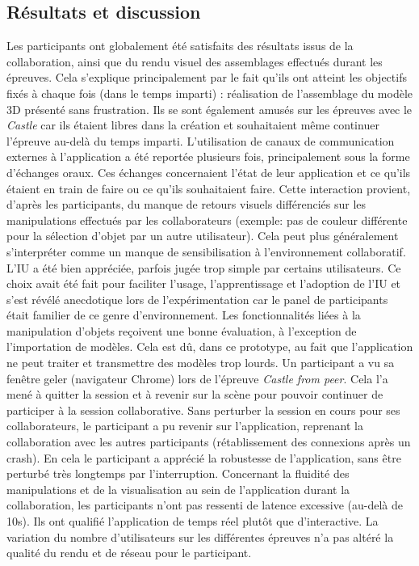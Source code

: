 \subsection{Résultats et discussion}
Les participants ont globalement été satisfaits des résultats issus de la 
collaboration, ainsi que du rendu visuel des assemblages effectués durant les 
épreuves. Cela s'explique principalement par le fait qu'ils ont atteint les 
objectifs fixés à chaque fois (dans le temps imparti) : réalisation de l'assemblage du modèle \gls{3D} 
présenté sans frustration. Ils se sont également \og amusés\fg{} sur les épreuves
avec le \textit{Castle} car ils étaient libres dans la création et souhaitaient même continuer l'épreuve au-delà du temps imparti. L'utilisation de canaux de communication 
externes à l'application a été reportée plusieurs fois, principalement sous la forme 
d'échanges oraux. Ces échanges concernaient l'état de leur application et ce qu'ils 
étaient en train de faire ou ce qu'ils souhaitaient faire. Cette interaction provient, 
d'après les participants, du manque de retours visuels différenciés sur les 
manipulations effectués par les collaborateurs (exemple: pas de couleur différente 
pour la sélection d'objet par un autre utilisateur). Cela peut plus généralement 
s'interpréter comme un manque de sensibilisation à l'environnement collaboratif. 
L'\gls{IU} a été bien appréciée, parfois jugée \og trop simple\fg{} par certains 
utilisateurs. Ce choix avait été fait pour faciliter l'usage, l'apprentissage et 
l'adoption de l'\gls{IU} et s'est révélé anecdotique lors de l'expérimentation car le 
panel de participants était familier de ce genre 
d'environnement.
Les fonctionnalités liées à la manipulation d'objets reçoivent une bonne évaluation, 
à l'exception de l'importation de modèles. Cela est dû, dans ce prototype, au 
fait que l'application ne peut traiter et transmettre des modèles trop lourds. Un 
participant a vu sa fenêtre \og geler\fg{} (navigateur Chrome) lors de l'épreuve 
\textit{Castle from peer}. Cela l'a mené à quitter la session et à revenir sur la 
scène pour pouvoir continuer de participer à la session collaborative. Sans 
perturber la session en cours pour ses collaborateurs, le participant a pu revenir sur 
l'application, reprenant la collaboration avec les autres participants (rétablissement 
des connexions après un crash). En cela le participant a apprécié la robustesse de 
l'application, sans être perturbé très longtemps par l'interruption.
Concernant la fluidité des manipulations et de la visualisation au sein de 
l'application durant la collaboration, les participants n'ont pas ressenti de latence 
excessive (au-delà de 10s). Ils ont qualifié l'application de \og temps réel\fg{} plutôt 
que d'\og interactive\fg{}. La variation du nombre d'utilisateurs sur les différentes 
épreuves n'a pas altéré la qualité du rendu et de réseau pour le participant.

